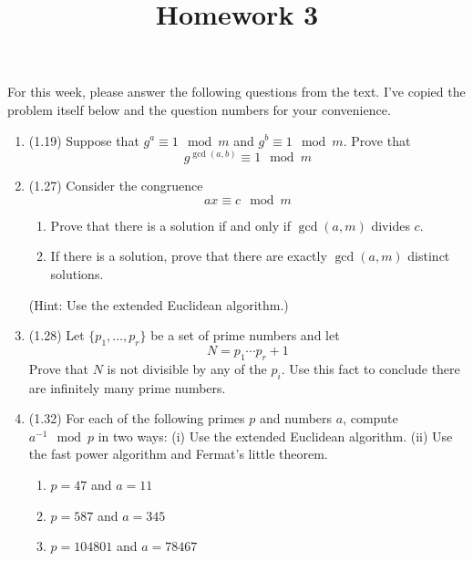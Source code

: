 \documentclass[12pt]{amsart}
\theoremstyle{definition}
\begin{document}
\title{Homework 3}

\maketitle

For this week, please answer the following questions from the text. 
I've copied the problem itself below and the question numbers for 
your convenience. 

\begin{enumerate}
	\item (1.19) Suppose that $g^a \equiv 1 \mod m$ and $g^b \equiv 1 \mod m$. Prove that 
	\begin{displaymath}
		g^{\operatorname{gcd}(a,b)} \equiv 1 \mod m
	\end{displaymath}

	\item (1.27) Consider the congruence 
	\begin{displaymath}
		ax \equiv c \mod m
	\end{displaymath}
	\begin{enumerate}
		\item Prove that there is a solution if and only if $\operatorname{gcd}(a,m)$ divides $c$. 
		\item If there is a solution, prove that there are exactly $\operatorname{gcd}(a,m)$ 
			distinct solutions. 
	\end{enumerate}
	(Hint: Use the extended Euclidean algorithm.)

	\item (1.28) Let $\lbrace p_1,\ldots,p_r \rbrace$ be a set of prime numbers and let 
	\begin{displaymath}
		N = p_1 \cdots p_r + 1 
	\end{displaymath}
	Prove that $N$ is not divisible by any of the $p_i$. Use this fact to conclude there are infinitely 
	many prime numbers.

	\item (1.32) For each of the following primes $p$ and numbers $a$, compute $a^{-1} \mod p$ in two 
		ways: (i) Use the extended Euclidean algorithm. (ii) Use the fast power algorithm and 
		Fermat's little theorem. 
	\begin{enumerate}
		\item $p=47$ and $a=11$
		\item $p=587$ and $a=345$
		\item $p=104801$ and $a=78467$
	\end{enumerate}


\end{enumerate}
\end{document}
